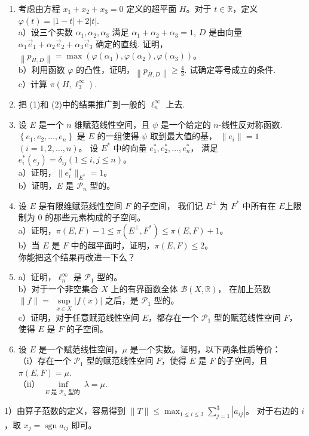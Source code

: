 \begin{enumerate}
\begin{enumerate}[label=(\arabic*)]
\item 考虑由方程 $x_{1}+x_{2}+x_{3}=0$ 定义的超平面 $H$。对于 $t \in \mathbb{R}$，定义 $\varphi(t)=|1-t|+2|t|$.\\
a）设三个实数 $\alpha_{1}, \alpha_{2}, \alpha_{3}$ 满足 $\alpha_{1}+\alpha_{2}+\alpha_{3}=1$, 
$D$ 是由向量 $\alpha_{1} \vec{e}_{1}+\alpha_{2} \vec{e}_{2}+\alpha_{3} \vec{e}_{3}$ 确定的直线. 
证明，$\left\|p_{H, D}\right\|=\max (\varphi(\alpha_{1}), \varphi(\alpha_{2}), \varphi(\alpha_{3}))$。\\
b）利用函数 $\varphi$ 的凸性，证明，$\left\|p_{H, D}\right\| \geqslant \frac{4}{3}$. 试确定等号成立的条件.\\
c）计算 $\pi(H, \ell_{3}^{\infty})$.
\item 把 (1)和 (2)中的结果推广到一般的 $\ell_{n}^{\infty}$ 上去.
\item 设 $E$ 是一个 $n$ 维赋范线性空间，且 $\psi$ 是一个给定的 $n$-线性反对称函数.
$\left\{e_{1}, e_{2}, \ldots, e_{n}\right\}$ 是 $E$ 的一组使得 $\psi$ 取到最大值的基，
$\|e_{i}\|=1$ $(i=1,2, \ldots, n)$。
设 $E^{*}$ 中的向量 $e_{1}^{*}, e_{2}^{*}, \ldots, e_{n}^{*}$，
满足 $e_{i}^{*}(e_{j})=\delta_{i j}(1 \leqslant i, j \leqslant n)$。\\
a）证明，$\|e_{i}^{*}\|_{E^{*}}=1$。\\
b）证明，$E$ 是 $\mathcal{P}_{n}$ 型的。

\item 设 $E$ 是有限维赋范线性空间 $F$ 的子空间，
我们记 $E^{\perp}$ 为 $F^{*}$ 中所有在 $E$上限制为 $0$ 的那些元素构成的子空间。\\
a）证明，$\pi(E, F)-1 \leqslant \pi(E^{\perp}, F^{*}) \leqslant \pi(E, F)+1$。\\
b）当 $E$ 是 $F$ 中的超平面时，证明，$\pi(E, F) \leqslant 2$。\\
你能把这个结果再改进一下么？

\item a）证明，$\ell_{n}^{\infty}$ 是 $\mathcal{P}_{1}$ 型的。\\
b）对于一个非空集合 $X$ 上的有界函数全体 $\mathcal{B}(X, \mathbb{R})$，
在加上范数 $\|f\|=$ $\sup \limits_{x \in X}|f(x)|$ 之后，是 $\mathcal{P}_{1}$ 型的。\\
c）证明，对于任意赋范线性空间 $E$，都存在一个 $\mathcal{P}_{1}$ 型的赋范线性空间 $F$，使得 $E$ 是 $F$ 的子空间。

\item 设 $E$ 是一个赋范线性空间，$\mu$ 是一个实数。证明，以下两条性质等价：\\
（i）存在一个 $\mathcal{P}_{1}$ 型的赋范线性空间 $F$，使得 $E$ 是 $F$ 的子空间，且 $\pi(E, F)=\mu$.\\
（ii） $\inf \limits_{E \text { 是 } \mathcal{P}_{\lambda} \text { 型的 }} \lambda=\mu$.
\end{enumerate}
\begin{proofc}
1）由算子范数的定义，容易得到 $\displaystyle \|T\| \leqslant \max _{1 \leqslant i \leqslant 3} \sum_{j=1}^{3}\left|a_{i j}\right|$。
对于右边的 $i$，取 $x_{j}=\operatorname{sgn} a_{ij}$ 即可。


\end{proofc}
\end{enumerate}
